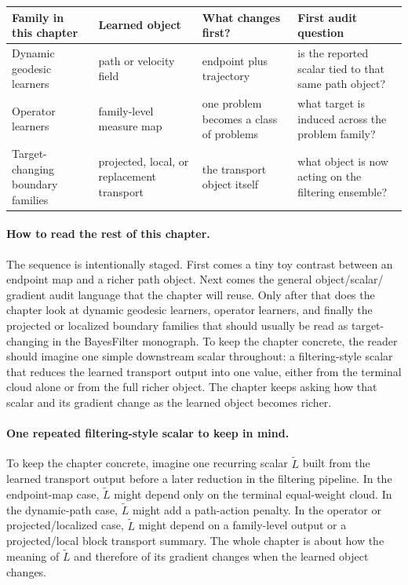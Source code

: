 \begin{center}
\small
\begin{tabular}{p{} p{} p{} p{}}
\toprule
Family in this chapter & Learned object & What changes first? & First audit question \\
\midrule
Dynamic geodesic learners & path or velocity field & endpoint plus trajectory & is the reported scalar tied to that same path object? \\
Operator learners & family-level measure map & one problem becomes a class of problems & what target is induced across the problem family? \\
Target-changing boundary families & projected, local, or replacement transport & the transport object itself & what object is now acting on the filtering ensemble? \\
\bottomrule
\end{tabular}
\end{center}

\paragraph{How to read the rest of this chapter.}
The sequence is intentionally staged.  First comes a tiny toy contrast between an
endpoint map and a richer path object.  Next comes the general object/scalar/
gradient audit language that the chapter will reuse.  Only after that does the
chapter look at dynamic geodesic learners, operator learners, and finally the
projected or localized boundary families that should usually be read as target-
changing in the BayesFilter monograph.  To keep the chapter concrete, the reader
should imagine one simple downstream scalar throughout: a filtering-style scalar that
reduces the learned transport output into one value, either from the terminal cloud
alone or from the full richer object.  The chapter keeps asking how that scalar and
its gradient change as the learned object becomes richer.

\paragraph{One repeated filtering-style scalar to keep in mind.}
To keep the chapter concrete, imagine one recurring scalar
\(\widetilde L\) built from the learned transport output before a later reduction in
the filtering pipeline.  In the endpoint-map case, \(\widetilde L\) might depend
only on the terminal equal-weight cloud.  In the dynamic-path case, \(\widetilde
L\) might add a path-action penalty.  In the operator or projected/localized case,
\(\widetilde L\) might depend on a family-level output or a projected/local block
transport summary.  The whole chapter is about how the meaning of \(\widetilde L\)
and therefore of its gradient changes when the learned object changes.

